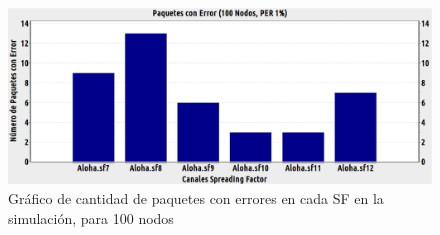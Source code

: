 \begin{figure}[!ht]
\centering
\includegraphics[angle=270, scale=0.4]{images/errores100nodos.eps}
\caption{Gráfico de cantidad de paquetes con errores en cada SF en la simulación, para 100 nodos}
\label{anexb:4}
\end{figure}
